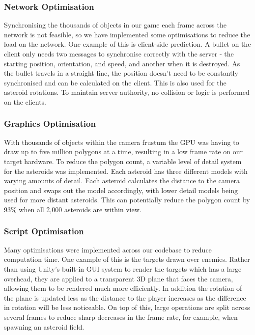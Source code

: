 \documentclass[a4paper,11pt]{article}
\begin{document}
\subsubsection{Network Optimisation}
Synchronising the thousands of objects in our game each frame across the network is not feasible, so we have implemented some optimisations to reduce the load on the network. One example of this is client-side prediction. A bullet on the client only needs two messages to synchronise correctly with the server - the starting position, orientation, and speed, and another when it is destroyed. As the bullet travels in a straight line, the position doesn’t need to be constantly synchronised and can be calculated on the client. This is also used for the asteroid rotations. To maintain server authority, no collision or logic is performed on the clients.

\subsubsection{Graphics Optimisation}
With thousands of objects within the camera frustum the GPU was having to draw up to five million polygons at a time, resulting in a low frame rate on our target hardware. To reduce the polygon count, a variable level of detail system for the asteroids was implemented. Each asteroid has three different models with varying amounts of detail. Each asteroid calculates the distance to the camera position and swaps out the model accordingly, with lower detail models being used for more distant asteroids. This can potentially reduce the polygon count by 93\% when all 2,000 asteroids are within view.

\subsubsection{Script Optimisation}
Many optimisations were implemented across our codebase to reduce computation time. One example of this is the targets drawn over enemies. Rather than using Unity’s built-in GUI system to render the targets which has a large overhead, they are applied to a transparent 3D plane that faces the camera, allowing them to be rendered much more efficiently. In addition the rotation of the plane is updated less as the distance to the player increases as the difference in rotation will be less noticeable. On top of this, large operations are split across several frames to reduce sharp decreases in the frame rate, for example, when spawning an asteroid field.
\end{document}
